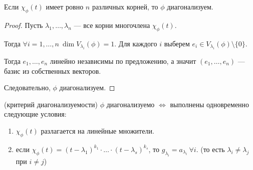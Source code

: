 \begin{corollary}
    Если $\chi_\phi(t)$ имеет ровно $n$ различных корней, то $\phi$ диагонализуем.
\end{corollary}

\begin{proof}
    Пусть $\lambda_1, \dots, \lambda_n$ --- все корни многочлена $\chi_\phi(t)$. 

    Тогда $\forall i = 1, \dots, n \ \dim V_{\lambda_i}(\phi) = 1$. Для каждого $i$ выберем $e_i \in V_{\lambda_i}(\phi) \setminus \{0\}$.

    Тогда $e_1, \dots, e_n$ линейно независимы по предложению, а значит $(e_1, \dots, e_n)$ --- базис из собственных векторов.

    Следовательно, $\phi$ диагонализуем.
\end{proof}

\begin{theorem}{(критерий диагонализуемости)} $\phi$ диагонализуемо $\iff$ выполнены одновременно следующие условия:

    \begin{enumerate}
        \item $\chi_\phi(t)$ разлагается на линейные множители.
        \item если $\chi_\phi(t) = (t - \lambda_1)^{k_1} \cdot \ldots \cdot (t - \lambda_s)^{k_s}$, то $g_{\lambda_i} = a_{\lambda_i} \ \forall i$. (то есть $\lambda_i \neq \lambda_j$ при $i \neq j$)
    \end{enumerate}
\end{theorem}

\begin{comment}
    Если выполнено только 1), то $\phi$ можно привести к жордановой нормальной форме:

    $\exists$ базис $\E$, такой что $A(\phi, \E)$ имеет вид
    \begin{equation*}
        \begin{pmatrix} 
            J_{\mu_1}^{m_1} & 0 & \dots & 0 \\
            0 & J_{\mu_2}^{m_2} & \dots & 0 \\
            \vdots & \vdots & \ddots & \vdots \\
            0 & 0 & \dots & J_{\mu_s}^{m_s}
        \end{pmatrix}
    ,\end{equation*}
    где $J_{\mu}^m \in M_n(F)$ --- жорданова клетка порядка $m$ с собственным значением $\mu$.
    \begin{equation*}
        J_{\mu}^m = \begin{pmatrix} 
            \mu & 1 & 0 & \dots & 0 & 0 \\
            0 & \mu & 1 & \dots & 0 & 0 \\
            0 & 0 & \mu & \ddots & 0 & 0 \\
            \vdots & \vdots & \vdots & \ddots & \ddots & \vdots \\
            0 & 0 & 0 & \dots & \mu & 1 \\
            0 & 0 & 0 & \dots & 0 & \mu
        \end{pmatrix}
    \end{equation*}
\end{comment}
